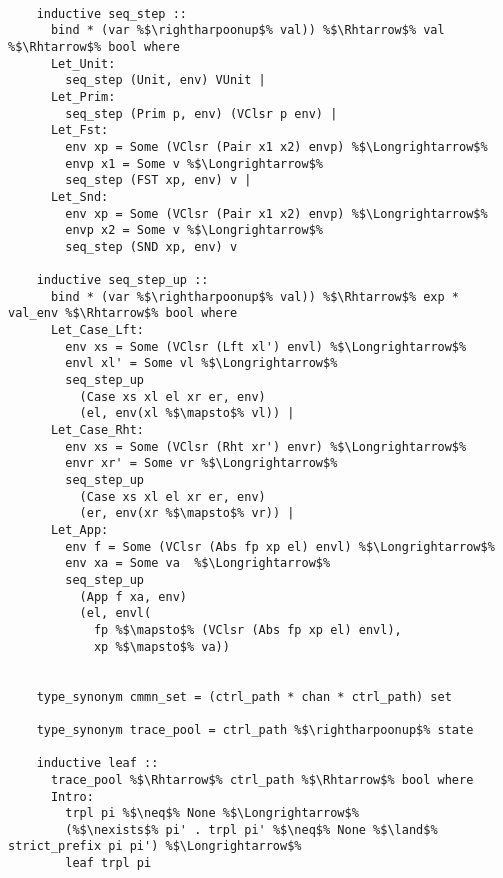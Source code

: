 \documentclass{article}
\begin{document}
  \begin{lstlisting}[style=codestyle1, escapechar=\%]

    inductive seq_step ::
      bind * (var %$\rightharpoonup$% val)) %$\Rhtarrow$% val %$\Rhtarrow$% bool where
      Let_Unit: 
        seq_step (Unit, env) VUnit |
      Let_Prim:
        seq_step (Prim p, env) (VClsr p env) |
      Let_Fst:
        env xp = Some (VClsr (Pair x1 x2) envp) %$\Longrightarrow$%
        envp x1 = Some v %$\Longrightarrow$% 
        seq_step (FST xp, env) v |
      Let_Snd: 
        env xp = Some (VClsr (Pair x1 x2) envp) %$\Longrightarrow$%  
        envp x2 = Some v %$\Longrightarrow$% 
        seq_step (SND xp, env) v

    inductive seq_step_up ::
      bind * (var %$\rightharpoonup$% val)) %$\Rhtarrow$% exp * val_env %$\Rhtarrow$% bool where 
      Let_Case_Lft:
        env xs = Some (VClsr (Lft xl') envl) %$\Longrightarrow$%
        envl xl' = Some vl %$\Longrightarrow$%
        seq_step_up
          (Case xs xl el xr er, env)
          (el, env(xl %$\mapsto$% vl)) |
      Let_Case_Rht: 
        env xs = Some (VClsr (Rht xr') envr) %$\Longrightarrow$% 
        envr xr' = Some vr %$\Longrightarrow$%
        seq_step_up
          (Case xs xl el xr er, env)
          (er, env(xr %$\mapsto$% vr)) |
      Let_App:
        env f = Some (VClsr (Abs fp xp el) envl) %$\Longrightarrow$% 
        env xa = Some va  %$\Longrightarrow$% 
        seq_step_up
          (App f xa, env)
          (el, envl(
            fp %$\mapsto$% (VClsr (Abs fp xp el) envl),
            xp %$\mapsto$% va))


    type_synonym cmmn_set = (ctrl_path * chan * ctrl_path) set

    type_synonym trace_pool = ctrl_path %$\rightharpoonup$% state

    inductive leaf ::
      trace_pool %$\Rhtarrow$% ctrl_path %$\Rhtarrow$% bool where
      Intro:
        trpl pi %$\neq$% None %$\Longrightarrow$% 
        (%$\nexists$% pi' . trpl pi' %$\neq$% None %$\land$% strict_prefix pi pi') %$\Longrightarrow$%  
        leaf trpl pi


\end{lstlisting}
\end{document}
